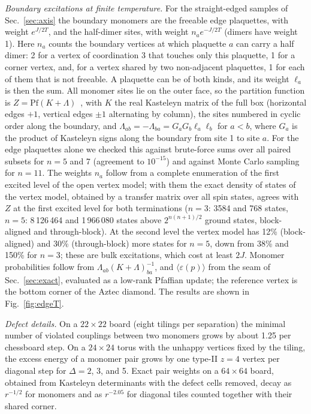\documentclass[aps,prb,twocolumn,floatfix,longbibliography]{revtex4-2}
\newcommand{\eps}{\varepsilon}
\begin{document}
\emph{Boundary excitations at finite temperature.} For the straight-edged samples of Sec.~\ref{sec:axis} the boundary monomers are the freeable edge plaquettes, with weight $e^{J/2T}$, and the half-dimer sites, with weight $n_a e^{-J/2T}$ (dimers have weight 1). Here $n_a$ counts the boundary vertices at which plaquette $a$ can carry a half dimer: 2 for a vertex of coordination 3 that touches only this plaquette, 1 for a corner vertex, and, for a vertex shared by two non-adjacent plaquettes, 1 for each of them that is not freeable. A plaquette can be of both kinds, and its weight $\ell_a$ is then the sum. All monomer sites lie on the outer face, so the partition function is $Z=\mathrm{Pf}(K+\Lambda)$~\cite{Giuliani2016}, with $K$ the real Kasteleyn matrix of the full box (horizontal edges $+1$, vertical edges $\pm1$ alternating by column), the sites numbered in cyclic order along the boundary, and $\Lambda_{ab}=-\Lambda_{ba}=G_aG_b\ell_a\ell_b$ for $a<b$, where $G_a$ is the product of Kasteleyn signs along the boundary from site 1 to site $a$. For the edge plaquettes alone we checked this against brute-force sums over all paired subsets for $n=5$ and 7 (agreement to $10^{-15}$) and against Monte Carlo sampling for $n=11$. The weights $n_a$ follow from a complete enumeration of the first excited level of the open vertex model; with them the exact density of states of the vertex model, obtained by a transfer matrix over all spin states, agrees with $Z$ at the first excited level for both terminations ($n=3$: 3584 and 768 states, $n=5$: 8\,126\,464 and 1\,966\,080 states above $2^{n(n+1)/2}$ ground states, block-aligned and through-block). At the second level the vertex model has 12\% (block-aligned) and 30\% (through-block) more states for $n=5$, down from 38\% and 150\% for $n=3$; these are bulk excitations, which cost at least $2J$. Monomer probabilities follow from $\Lambda_{ab}(K+\Lambda)^{-1}_{ba}$, and $\langle\eps(p)\rangle$ from the seam of Sec.~\ref{sec:exact}, evaluated as a low-rank Pfaffian update; the reference vertex is the bottom corner of the Aztec diamond. The results are shown in Fig.~\ref{fig:edgeT}.



\emph{Defect details.} On a $22\times22$ board (eight tilings per separation) the minimal number of violated couplings between two monomers grows by about 1.25 per chessboard step. On a $24\times24$ torus with the unhappy vertices fixed by the tiling, the excess energy of a monomer pair grows by one type-II $z=4$ vertex per diagonal step for $\Delta=2$, 3, and 5. Exact pair weights on a $64\times64$ board, obtained from Kasteleyn determinants with the defect cells removed, decay as $r^{-1/2}$ for monomers and as $r^{-2.05}$ for diagonal tiles counted together with their shared corner.
\end{document}
